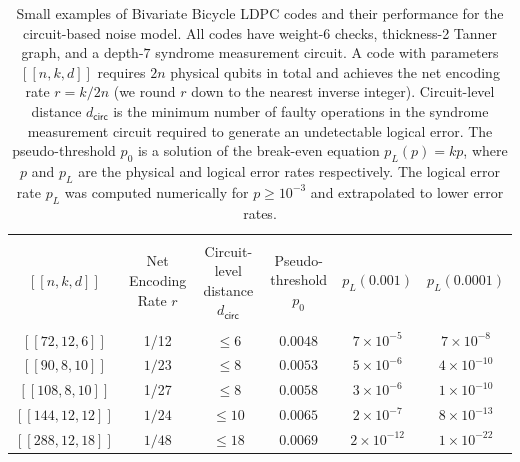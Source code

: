\documentclass{article}
\newcommand{\dcirc}{d_{\mathsf{circ}}}
\begin{document}
\begin{table}[t]
\begin{center}
\begin{tabular}{c|c|c|c|c|c}
\hline
& & & &    \\
$[[n,k,d]]$ & \parbox{3cm}{\centering Net Encoding \\ Rate $r$}  & 
\parbox{3cm}{\centering Circuit-level\\ distance $\dcirc$} &
Pseudo-threshold $p_{0}$ & 
$p_L(0.001)$ & $p_L(0.0001)$ \\
& & & & \\
\hline
\hline
$[[72,12,6]]$ &  1/12 & $\le 6$ &  $0.0048$ & $7\times 10^{-5}$ & $7 \times 10^{-8}$    \\
\hline 
$[[90,8,10]]$ & $1/23$ & $\le 8$ &   $0.0053$  & $5\times 10^{-6}$ & $4 \times 10^{-10}$ \\
\hline
$[[108,8,10]]$ &  1/27 & $\le 8$ & $0.0058$  & 
$3\times 10^{-6}$ & $1\times 10^{-10}$ \\
\hline
$[[144,12,12]]$ & $1/24$ & $\le 10$ & $0.0065$  & $2\times 10^{-7}$ & $8\times 10^{-13}$ \\
\hline
$[[288,12,18]]$ & $1/48$ & $\le 18$ &  $0.0069$  & $2\times 10^{-12}$ & $1\times 10^{-22}$ \\
\end{tabular}
\end{center}
\caption{Small examples of Bivariate Bicycle LDPC codes and their 
performance for the circuit-based noise model.
All codes have weight-6 checks, thickness-2 Tanner graph, and a  depth-$7$ syndrome measurement circuit. A code with parameters $[[n,k,d]]$
requires $2n$ physical qubits in total
and achieves the net encoding rate $r=k/2n$
(we round $r$ down to the nearest inverse integer).
Circuit-level distance $\dcirc$
is the minimum number of faulty operations in the syndrome measurement circuit required to generate an undetectable logical error.
The pseudo-threshold $p_{0}$ is
a solution of the  break-even equation $p_L(p)=kp$,
where $p$ and $p_L$ are the physical and logical error rates
respectively. The logical error rate $p_L$ was computed numerically for $p\ge 10^{-3}$
and extrapolated to lower error rates.
}
\label{table:codes_intro}
\end{table}
\end{document}
